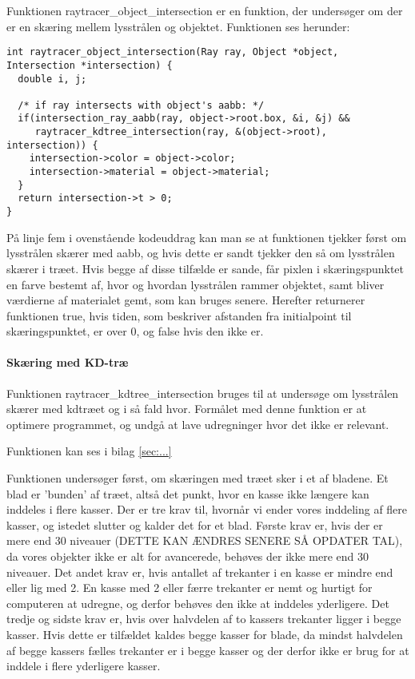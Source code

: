 Funktionen raytracer\_object\_intersection er en funktion, der undersøger om der er en skæring mellem lysstrålen og objektet. Funktionen ses herunder:

\begin{lstlisting}[style=Cstyle, caption=raytracer\_object\_intersection]
int raytracer_object_intersection(Ray ray, Object *object, Intersection *intersection) {
  double i, j;
  
  /* if ray intersects with object's aabb: */
  if(intersection_ray_aabb(ray, object->root.box, &i, &j) && 
     raytracer_kdtree_intersection(ray, &(object->root), intersection)) {
    intersection->color = object->color;
    intersection->material = object->material;
  }
  return intersection->t > 0;
}
\end{lstlisting}

På linje fem i ovenstående kodeuddrag kan man se at funktionen tjekker først om lysstrålen skærer med aabb, og hvis dette er sandt tjekker den så om lysstrålen skærer i træet. Hvis begge af disse tilfælde er sande, får pixlen i skæringspunktet en farve bestemt af, hvor og hvordan lysstrålen rammer objektet, samt bliver værdierne af materialet gemt, som kan bruges senere. Herefter returnerer funktionen true, hvis tiden, som beskriver afstanden fra initialpoint til skæringspunktet, er over 0, og false hvis den ikke er.

\paragraph{Skæring med KD-træ}

Funktionen raytracer\_kdtree\_intersection bruges til at undersøge om lysstrålen skærer med kdtræet og i så fald hvor. Formålet med denne funktion er at optimere programmet, og undgå at lave udregninger hvor det ikke er relevant. 

Funktionen kan ses i bilag \ref{sec:...}

Funktionen undersøger først, om skæringen med træet sker i et af bladene. Et blad er 'bunden' af træet, altså det punkt, hvor en kasse ikke længere kan inddeles i flere kasser. Der er tre krav til, hvornår vi ender vores inddeling af flere kasser, og istedet slutter og kalder det for et blad. Første krav er, hvis der er mere end 30 niveauer (DETTE KAN ÆNDRES SENERE  SÅ OPDATER TAL), da vores objekter ikke er alt for avancerede, behøves der ikke mere end 30 niveauer. Det andet krav er, hvis antallet af trekanter i en kasse er mindre end eller lig med 2. En kasse med 2 eller færre trekanter er nemt og hurtigt for computeren at udregne, og derfor behøves den ikke at inddeles yderligere. Det tredje og sidste krav er, hvis over halvdelen af to kassers trekanter ligger i begge kasser. Hvis dette er tilfældet kaldes begge kasser for blade, da mindst halvdelen af begge kassers fælles trekanter er i begge kasser og der derfor ikke er brug for at inddele i flere yderligere kasser.

